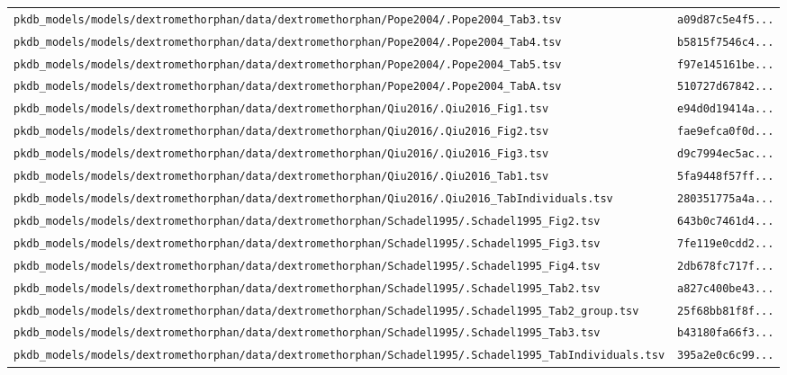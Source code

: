 \documentclass{article}
\begin{document}
\begin{longtable}{ll}
\texttt{pkdb\_models/models/dextromethorphan/data/dextromethorphan/Pope2004/.Pope2004\_Tab3.tsv} & \texttt{a09d87c5e4f5...} \\
\texttt{pkdb\_models/models/dextromethorphan/data/dextromethorphan/Pope2004/.Pope2004\_Tab4.tsv} & \texttt{b5815f7546c4...} \\
\texttt{pkdb\_models/models/dextromethorphan/data/dextromethorphan/Pope2004/.Pope2004\_Tab5.tsv} & \texttt{f97e145161be...} \\
\texttt{pkdb\_models/models/dextromethorphan/data/dextromethorphan/Pope2004/.Pope2004\_TabA.tsv} & \texttt{510727d67842...} \\
\texttt{pkdb\_models/models/dextromethorphan/data/dextromethorphan/Qiu2016/.Qiu2016\_Fig1.tsv} & \texttt{e94d0d19414a...} \\
\texttt{pkdb\_models/models/dextromethorphan/data/dextromethorphan/Qiu2016/.Qiu2016\_Fig2.tsv} & \texttt{fae9efca0f0d...} \\
\texttt{pkdb\_models/models/dextromethorphan/data/dextromethorphan/Qiu2016/.Qiu2016\_Fig3.tsv} & \texttt{d9c7994ec5ac...} \\
\texttt{pkdb\_models/models/dextromethorphan/data/dextromethorphan/Qiu2016/.Qiu2016\_Tab1.tsv} & \texttt{5fa9448f57ff...} \\
\texttt{pkdb\_models/models/dextromethorphan/data/dextromethorphan/Qiu2016/.Qiu2016\_TabIndividuals.tsv} & \texttt{280351775a4a...} \\
\texttt{pkdb\_models/models/dextromethorphan/data/dextromethorphan/Schadel1995/.Schadel1995\_Fig2.tsv} & \texttt{643b0c7461d4...} \\
\texttt{pkdb\_models/models/dextromethorphan/data/dextromethorphan/Schadel1995/.Schadel1995\_Fig3.tsv} & \texttt{7fe119e0cdd2...} \\
\texttt{pkdb\_models/models/dextromethorphan/data/dextromethorphan/Schadel1995/.Schadel1995\_Fig4.tsv} & \texttt{2db678fc717f...} \\
\texttt{pkdb\_models/models/dextromethorphan/data/dextromethorphan/Schadel1995/.Schadel1995\_Tab2.tsv} & \texttt{a827c400be43...} \\
\texttt{pkdb\_models/models/dextromethorphan/data/dextromethorphan/Schadel1995/.Schadel1995\_Tab2\_group.tsv} & \texttt{25f68bb81f8f...} \\
\texttt{pkdb\_models/models/dextromethorphan/data/dextromethorphan/Schadel1995/.Schadel1995\_Tab3.tsv} & \texttt{b43180fa66f3...} \\
\texttt{pkdb\_models/models/dextromethorphan/data/dextromethorphan/Schadel1995/.Schadel1995\_TabIndividuals.tsv} & \texttt{395a2e0c6c99...} \\

\end{longtable}
\end{document}
